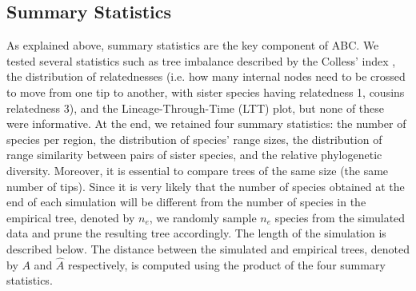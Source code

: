 \subsection*{Summary Statistics}
\noindent As explained above, summary statistics are the key component of ABC. 
We tested several statistics such as tree imbalance described by the Colless’ index \citep{Colless1982}, the distribution of relatednesses (i.e. how many internal nodes need to be crossed to move from one tip to another, with sister species having relatedness 1, cousins relatedness 3), and the Lineage-Through-Time (LTT) plot, but none of these were informative. 
At the end, we retained four summary statistics: the number of species per region, the distribution of species’ range sizes, the distribution of range similarity between pairs of sister species, and the relative phylogenetic diversity. 
Moreover, it is essential to compare trees of the same size (the same number of tips). 
Since it is very likely that the number of species obtained at the end of each simulation will be different from the number of species in the empirical tree, denoted by $n_e$, we randomly sample $n_e$ species from the simulated data and prune the resulting tree accordingly. 
The length of the simulation is described below. 
The distance between the simulated and empirical trees, denoted by $A$ and $\hat{A}$ respectively, is computed using the product of the four summary statistics.

